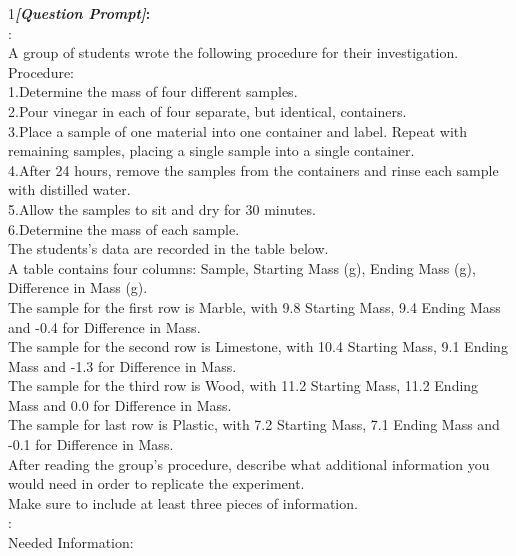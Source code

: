 \begin{figure*}
\begin{tcolorbox}[
    colback=gray!10,      %
    colframe=gray!80,     %
    title=Case Study 3,
    fonttitle=\bfseries,  %
    rounded corners,
    boxrule=0.5mm,        %
    width=\linewidth
]
\scriptsize
\textcircled{\raisebox{-0.3pt} {\scriptsize1}}\textbf{\emph{[Question Prompt]}:}\\
\text{[Question]}: \\
A group of students wrote the following procedure for their investigation.\\
Procedure:\\
1.Determine the mass of four different samples.\\
2.Pour vinegar in each of four separate, but identical, containers.\\
3.Place a sample of one material into one container and label. Repeat with remaining samples, placing a single sample into a single container.\\
4.After 24 hours, remove the samples from the containers and rinse each sample with distilled water.\\
5.Allow the samples to sit and dry for 30 minutes.\\
6.Determine the mass of each sample.\\
The students's data are recorded in the table below.\\
A table contains four columns: Sample, Starting Mass (g), Ending Mass (g), Difference in Mass (g).\\
The sample for the first row is Marble, with 9.8 Starting Mass, 9.4 Ending Mass and -0.4 for Difference in Mass.\\
The sample for the second row is Limestone, with 10.4 Starting Mass, 9.1 Ending Mass and -1.3 for Difference in Mass.\\
The sample for the third row is Wood, with 11.2 Starting Mass, 11.2 Ending Mass and 0.0 for Difference in Mass.\\
The sample for last row is Plastic, with 7.2 Starting Mass, 7.1 Ending Mass and -0.1 for Difference in Mass.\\
After reading the group's procedure, describe what additional information you would need in order to replicate the experiment.\\
Make sure to include at least three pieces of information.\\
: \\
Needed Information:\\

\end{tcolorbox}
\end{figure*}

